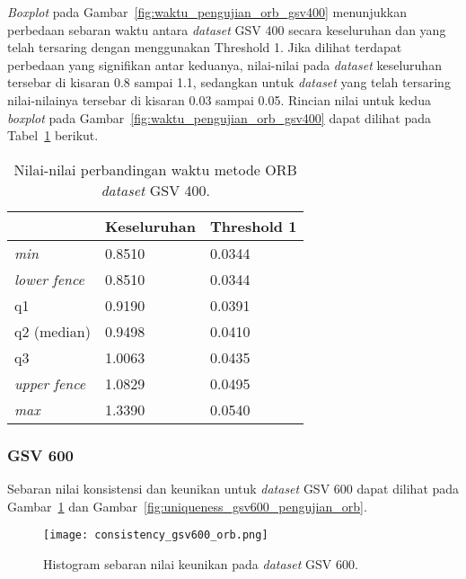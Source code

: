 \textit{Boxplot} pada Gambar~\ref{fig:waktu_pengujian_orb_gsv400} menunjukkan perbedaan sebaran waktu antara \textit{dataset} GSV 400 secara keseluruhan dan yang telah tersaring dengan menggunakan Threshold 1. Jika dilihat terdapat perbedaan yang signifikan antar keduanya, nilai-nilai pada \textit{dataset} keseluruhan tersebar di kisaran 0.8 sampai 1.1, sedangkan untuk \textit{dataset} yang telah tersaring nilai-nilainya tersebar di kisaran 0.03 sampai 0.05. Rincian nilai untuk kedua \textit{boxplot} pada Gambar~\ref{fig:waktu_pengujian_orb_gsv400} dapat dilihat pada Tabel~\ref{tab:boxplot_gsv400_orb} berikut.
\begin{table}[H]
	\centering
	\begin{tabular}{|l|l|l|}
		\hline
		& \textbf{Keseluruhan} & \textbf{Threshold 1}         \\ \hline
		\textit{min}          & 0.8510 & 0.0344               \\ \hline
		\textit{lower fence}  & 0.8510 & 0.0344               \\ \hline
		q1                    & 0.9190 & 0.0391               \\ \hline
		q2 (median)           & 0.9498 & 0.0410               \\ \hline
		q3                    & 1.0063 & 0.0435               \\ \hline
		\textit{upper fence}  & 1.0829 & 0.0495               \\ \hline
		\textit{max}          & 1.3390 & 0.0540               \\ \hline
	\end{tabular}
	\caption{Nilai-nilai perbandingan waktu metode ORB \textit{dataset} GSV 400.}
	\label{tab:boxplot_gsv400_orb}
\end{table}


\subsubsection{GSV 600}
Sebaran nilai konsistensi dan keunikan untuk \textit{dataset} GSV 600 dapat dilihat pada Gambar~\ref{fig:consistency_gsv600_pengujian_orb} dan Gambar~\ref{fig:uniqueness_gsv600_pengujian_orb}.
\begin{figure}[H]
	\centering
	\texttt{[image: consistency\_gsv600\_orb.png]}
	\caption{Histogram sebaran nilai keunikan pada \textit{dataset} GSV 600.}
	\label{fig:consistency_gsv600_pengujian_orb}
\end{figure}

